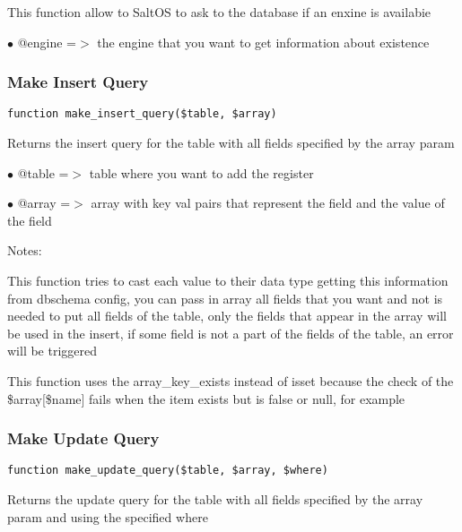 \documentclass[a4paper]{article}
\begin{document}
This function allow to SaltOS to ask to the database if an enxine is
availabie

\begin{compactitem}
\item[\color{myblue}$\bullet$] @engine =$>$ the engine that you want to get information about existence
\end{compactitem}

\hypertarget{toc225}{}
\subsubsection{Make Insert Query}

\begin{lstlisting}
function make_insert_query($table, $array)
\end{lstlisting}

Returns the insert query for the table with all fields specified by the
array param

\begin{compactitem}
\item[\color{myblue}$\bullet$] @table =$>$ table where you want to add the register
\item[\color{myblue}$\bullet$] @array =$>$ array with key val pairs that represent the field and the value
          of the field
\end{compactitem}

Notes:

This function tries to cast each value to their data type getting this
information from dbschema config, you can pass in array all fields that
you want and not is needed to put all fields of the table, only the
fields that appear in the array will be used in the insert, if some
field is not a part of the fields of the table, an error will be
triggered

This function uses the array\_key\_exists instead of isset because the
check of the \$array[\$name] fails when the item exists but is false or
null, for example

\hypertarget{toc226}{}
\subsubsection{Make Update Query}

\begin{lstlisting}
function make_update_query($table, $array, $where)
\end{lstlisting}

Returns the update query for the table with all fields specified by the
array param and using the specified where
\end{document}
